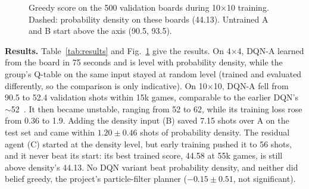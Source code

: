 \documentclass[conference,10pt]{IEEEtran}
\begin{document}
\begin{figure}[t]
\centering
{}
\caption{Greedy score on the 500 validation boards during 10$\times$10
training. Dashed: probability density on these boards (44.13). Untrained A and
B start above the axis (90.5, 93.5).}
\label{fig:curve}
\end{figure}

\textbf{Results.} Table~\ref{tab:results} and Fig.~\ref{fig:curve} give the
results. On 4$\times$4, DQN-A learned from the board in 75 seconds and is
level with probability density, while the group's Q-table on the same input
stayed at random level (trained and evaluated differently, so the comparison
is only indicative). On 10$\times$10, DQN-A fell
from 90.5 to 52.4 validation shots within 15k games, comparable to the earlier
DQN's $\sim$52~\cite{gaintel}. It then became unstable, ranging from 52 to 62,
while its training loss rose from 0.36 to 1.9. Adding the density input (B)
saved 7.15 shots over A on the test set and came within $1.20\pm0.46$ shots of
probability density. The residual agent (C) started at the density level, but
early training pushed it to 56 shots, and it never beat its start: its best
trained score, 44.58 at 55k games, is still above density's 44.13. No DQN variant beat probability
density, and neither did belief greedy, the project's particle-filter planner
($-0.15\pm0.51$, not significant).
\end{document}
